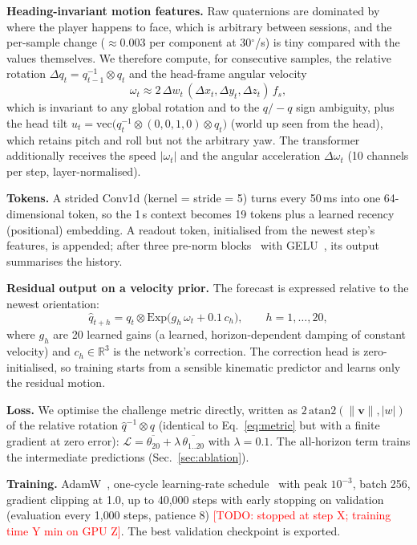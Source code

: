 \documentclass[conference]{IEEEtran}
\newcommand{\todo}[1]{\textcolor{red}{[TODO: #1]}}
\begin{document}
\textbf{Heading-invariant motion features.} Raw quaternions are dominated by where the player happens to face, which is
arbitrary between sessions, and the per-sample change ($\approx$0.003 per component at 30$^\circ$/s) is tiny compared with
the values themselves. We therefore compute, for consecutive samples, the relative rotation
$\Delta q_t = q_{t-1}^{-1}\otimes q_t$ and the head-frame angular velocity
\begin{equation}
\omega_t \approx 2\,\Delta w_t\,(\Delta x_t, \Delta y_t, \Delta z_t)\, f_s ,
\end{equation}
which is invariant to any global rotation and to the $q/-q$ sign ambiguity, plus the head tilt
$u_t = \mathrm{vec}\bigl(q_t^{-1}\otimes(0,0,1,0)\otimes q_t\bigr)$ (world up seen from the head), which retains pitch and
roll but not the arbitrary yaw. The transformer additionally receives the speed $|\omega_t|$ and the angular acceleration
$\Delta\omega_t$ (10 channels per step, layer-normalised).

\textbf{Tokens.} A strided Conv1d (kernel = stride = 5) turns every 50\,ms into one 64-dimensional token, so the 1\,s
context becomes 19 tokens plus a learned recency (positional) embedding. A readout token, initialised from the newest
step's features, is appended; after three pre-norm blocks~\cite{xiong2020} with GELU~\cite{hendrycks2016}, its output
summarises the history.

\textbf{Residual output on a velocity prior.} The forecast is expressed relative to the newest orientation:
\begin{equation}
\hat q_{t+h} = q_t \otimes \mathrm{Exp}\bigl(g_h\,\omega_t + 0.1\,c_h\bigr),\qquad h = 1,\dots,20,
\end{equation}
where $g_h$ are 20 learned gains (a learned, horizon-dependent damping of constant velocity) and $c_h\in\mathbb{R}^3$ is the
network's correction. The correction head is zero-initialised, so training starts from a sensible kinematic predictor and
learns only the residual motion.

\textbf{Loss.} We optimise the challenge metric directly, written as $2\,\mathrm{atan2}(\|\mathbf{v}\|, |w|)$ of the
relative rotation $\hat q^{-1}\otimes q$ (identical to Eq.~\ref{eq:metric} but with a finite gradient at zero error):
$\mathcal{L} = \overline{\theta_{20}} + \lambda\,\overline{\theta_{1..20}}$ with $\lambda = 0.1$. The all-horizon term
trains the intermediate predictions (Sec.~\ref{sec:ablation}).

\textbf{Training.} AdamW~\cite{loshchilov2019}, one-cycle learning-rate schedule~\cite{smith2019} with peak $10^{-3}$, batch
256, gradient clipping at 1.0, up to 40{,}000 steps with early stopping on validation (evaluation every 1{,}000 steps,
patience 8) \todo{stopped at step X; training time Y min on GPU Z}. The best validation checkpoint is exported.
\end{document}
